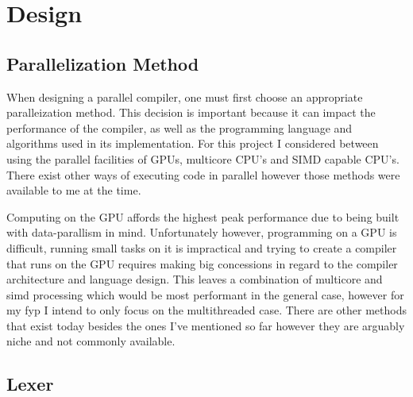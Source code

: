 \chapter{Design} \label{design}
\begin{comment}
\begin{itemize}
	\item Discuss the various approaches mentioned in the literature review, mentioning
		  their pros and cons. Write about the issues with designing a parallel compiler,
		  e.g issues common to all approaches. Elaborate on why tech choices are being
		  made e.g using rust. 
	\item Discuss my plan / design for the compiler.
\end{itemize}


\end{comment}

\section{Parallelization Method} \label{design_parallel_method}

When designing a parallel compiler, one must first choose an appropriate
paralleization method. This decision is important because it can impact the
performance of the compiler, as well as the programming language and algorithms
used in its implementation. For this project I considered between using the
parallel facilities of GPUs, multicore CPU's and SIMD capable CPU's. There exist
other ways of executing code in parallel however those methods were available to
me at the time.

Computing on the GPU affords the highest peak performance due to being built
with data-parallism in mind. Unfortunately however, programming on a GPU is
difficult, running small tasks on it is impractical and trying to create a
compiler that runs on the GPU requires making big concessions in regard to
the compiler architecture and language design. This leaves a combination
of multicore and \gls{simd} processing which would be most performant in
the general case, however for my \gls{fyp} I intend to only focus on the
multithreaded case. There are other methods that exist today besides the
ones I’ve mentioned so far however they are arguably niche and not commonly
available.

\section{Lexer} \label{lexer}

